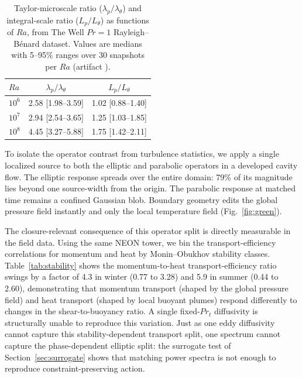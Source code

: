 \documentclass[11pt]{article}
\begin{document}
\begin{table}[t]
\centering
\caption{Taylor-microscale ratio ($\lambda_p/\lambda_\theta$) and integral-scale ratio ($L_p/L_\theta$) as functions of $Ra$, from The Well $Pr=1$ Rayleigh--B\'enard dataset. Values are medians with 5--95\% ranges over 30 snapshots per $Ra$ (artifact ).}
\label{tab:ra_sweep}
\begin{tabular}{lcc}
\toprule
$Ra$ & $\lambda_p/\lambda_\theta$ & $L_p/L_\theta$ \\
\midrule
$10^6$ & 2.58 [1.98--3.59] & 1.02 [0.88--1.40] \\
$10^7$ & 2.94 [2.54--3.65] & 1.25 [1.03--1.85] \\
$10^8$ & 4.45 [3.27--5.88] & 1.75 [1.42--2.11] \\
\bottomrule
\end{tabular}
\end{table}

To isolate the operator contrast from turbulence statistics, we apply a single localized source to both the elliptic and parabolic operators in a developed cavity flow. The elliptic response spreads over the entire domain: 79\% of its magnitude lies beyond one source-width from the origin. The parabolic response at matched time remains a confined Gaussian blob. Boundary geometry edits the global pressure field instantly and only the local temperature field (Fig.~\ref{fig:green}).

The closure-relevant consequence of this operator split is directly measurable in the field data. Using the same NEON tower, we bin the transport-efficiency correlations for momentum and heat by Monin--Obukhov stability classes. Table~\ref{tab:stability} shows the momentum-to-heat transport-efficiency ratio swings by a factor of 4.3 in winter (0.77 to 3.28) and 5.9 in summer (0.44 to 2.60), demonstrating that momentum transport (shaped by the global pressure field) and heat transport (shaped by local buoyant plumes) respond differently to changes in the shear-to-buoyancy ratio. A single fixed-$Pr_t$ diffusivity is structurally unable to reproduce this variation. Just as one eddy diffusivity cannot capture this stability-dependent transport split, one spectrum cannot capture the phase-dependent elliptic split: the surrogate test of Section~\ref{sec:surrogate} shows that matching power spectra is not enough to reproduce constraint-preserving action.
\end{document}
